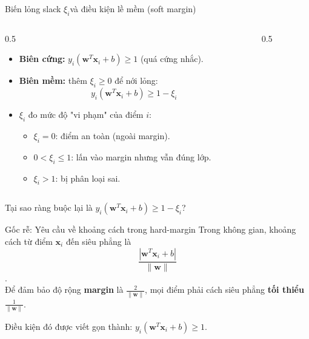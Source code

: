 \begin{frame}{Biến lỏng slack $\xi_i$​ và điều kiện lề mềm (soft margin)}
  \begin{columns}
    \begin{column}{0.5\textwidth}
      \begin{itemize}
        \item \textbf{Biên cứng:} $y_i(\bm{w}^T\bm{x}_i + b) \ge 1$ (quá cứng nhắc).
        \item \textbf{Biên mềm:} thêm $\xi_i \ge 0$ để nới lỏng:
        \[
        y_i(\bm{w}^T\bm{x}_i + b) \ge 1 - \xi_i
        \]
        \item $\xi_i$ đo mức độ "vi phạm" của điểm $i$:
        \begin{itemize}
          \item $\xi_i = 0$: điểm an toàn (ngoài margin).
          \item $0 < \xi_i \le 1$: lấn vào margin nhưng vẫn đúng lớp.
          \item $\xi_i > 1$: bị phân loại sai.
        \end{itemize}
      \end{itemize}
    \end{column}
    \begin{column}{0.5\textwidth}
      \centering
    \end{column}
  \end{columns}
\end{frame}

\begin{frame}{Tại sao ràng buộc lại là $y_i(\bm{w}^T\bm{x}_i + b) \ge 1 - \xi_i$?}
  \begin{block}{Gốc rễ: Yêu cầu về khoảng cách trong hard-margin}
    Trong không gian, khoảng cách từ điểm $\bm{x}_i$ đến siêu phẳng là $$\frac{|\bm{w}^T\bm{x}_i + b|}{\|\bm{w}\|}$$. \\
    Để đảm bảo độ rộng \textbf{margin} là $\frac{2}{\|\bm{w}\|}$, mọi điểm phải cách siêu phẳng \textbf{tối thiểu} $\frac{1}{\|\bm{w}\|}$. 
    
    \begin{center}
      Điều kiện đó được viết gọn thành: $y_i(\bm{w}^T\bm{x}_i + b) \ge 1$.
    \end{center}
  \end{block}

\end{frame}

